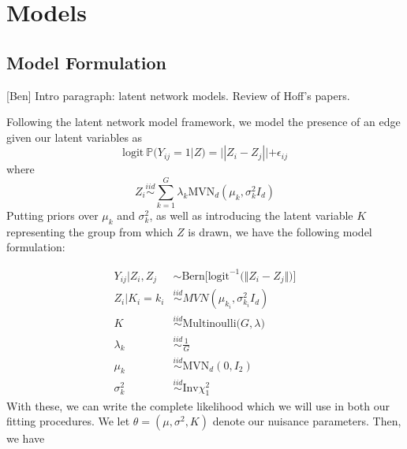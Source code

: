 \documentclass{article}
\begin{document}
\section{Models} \label{Models}


\subsection{Model Formulation}\label{Model Formulation}

[Ben] Intro paragraph: latent network models. Review of Hoff's papers. 

Following the latent network model framework, we model the presence of an edge given our latent variables as
\[\text{logit} \ \mathbb{P}(Y_{ij} = 1|Z) = ||Z_i - Z_j|| + \epsilon_{ij}\]
where
\[Z_i \overset{iid}{\sim}\sum_{k=1}^G \lambda_k\text{MVN}_d(\mu_k,\sigma_k^2I_d)\]
Putting priors over $\mu_k$ and  $\sigma_k^2$, as well as introducing the latent variable $K$ representing the group from which $Z$ is drawn, we have the following model formulation:

\begin{align*}
Y_{ij} | Z_i, Z_j &\sim \text{Bern}\Big[\text{logit}^{-1}\big(\Vert Z_i - Z_j \Vert\big)\Big] \\
Z_i | K_i = k_i &\overset{iid}\sim MVN(\mu_{k_i}, \sigma_{k_i}^2 I_d) \\
K &\overset{iid}\sim \text{Multinoulli}\big(G, \lambda \big) \\
\lambda_k &\overset{iid}\sim \frac{1}{G} \\
\mu_k &\overset{iid}\sim \text{MVN}_d(0, I_2) \\
\sigma_k^2 &\overset{iid}\sim \text{Inv} \chi^2_1
\end{align*}
With these, we can write the complete likelihood which we will use in both our fitting procedures. We let $\theta = (\mu, \sigma^2, K)$ denote our nuisance parameters. Then, we have
\end{document}
